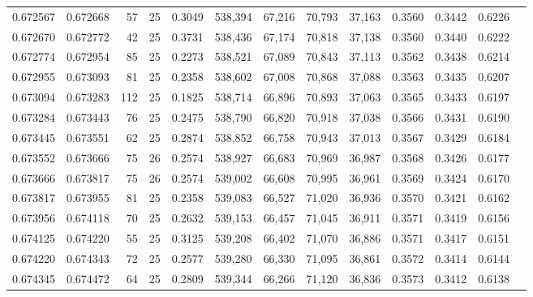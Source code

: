 \begin{tabular}{rrrrrrrrrrrrr}
0.672567 & 0.672668 &    57 &  25 &                                     0.3049 & 538,394 &  67,216 &  70,793 &  37,163 & 0.3560 & 0.3442 & 0.6226 \\
0.672670 & 0.672772 &    42 &  25 &                                     0.3731 & 538,436 &  67,174 &  70,818 &  37,138 & 0.3560 & 0.3440 & 0.6222 \\
0.672774 & 0.672954 &    85 &  25 &                                     0.2273 & 538,521 &  67,089 &  70,843 &  37,113 & 0.3562 & 0.3438 & 0.6214 \\
0.672955 & 0.673093 &    81 &  25 &                                     0.2358 & 538,602 &  67,008 &  70,868 &  37,088 & 0.3563 & 0.3435 & 0.6207 \\
0.673094 & 0.673283 &   112 &  25 &                                     0.1825 & 538,714 &  66,896 &  70,893 &  37,063 & 0.3565 & 0.3433 & 0.6197 \\
0.673284 & 0.673443 &    76 &  25 &                                     0.2475 & 538,790 &  66,820 &  70,918 &  37,038 & 0.3566 & 0.3431 & 0.6190 \\
0.673445 & 0.673551 &    62 &  25 &                                     0.2874 & 538,852 &  66,758 &  70,943 &  37,013 & 0.3567 & 0.3429 & 0.6184 \\
0.673552 & 0.673666 &    75 &  26 &                                     0.2574 & 538,927 &  66,683 &  70,969 &  36,987 & 0.3568 & 0.3426 & 0.6177 \\
0.673666 & 0.673817 &    75 &  26 &                                     0.2574 & 539,002 &  66,608 &  70,995 &  36,961 & 0.3569 & 0.3424 & 0.6170 \\
0.673817 & 0.673955 &    81 &  25 &                                     0.2358 & 539,083 &  66,527 &  71,020 &  36,936 & 0.3570 & 0.3421 & 0.6162 \\
0.673956 & 0.674118 &    70 &  25 &                                     0.2632 & 539,153 &  66,457 &  71,045 &  36,911 & 0.3571 & 0.3419 & 0.6156 \\
0.674125 & 0.674220 &    55 &  25 &                                     0.3125 & 539,208 &  66,402 &  71,070 &  36,886 & 0.3571 & 0.3417 & 0.6151 \\
0.674220 & 0.674343 &    72 &  25 &                                     0.2577 & 539,280 &  66,330 &  71,095 &  36,861 & 0.3572 & 0.3414 & 0.6144 \\
0.674345 & 0.674472 &    64 &  25 &                                     0.2809 & 539,344 &  66,266 &  71,120 &  36,836 & 0.3573 & 0.3412 & 0.6138 \\

\end{tabular}
